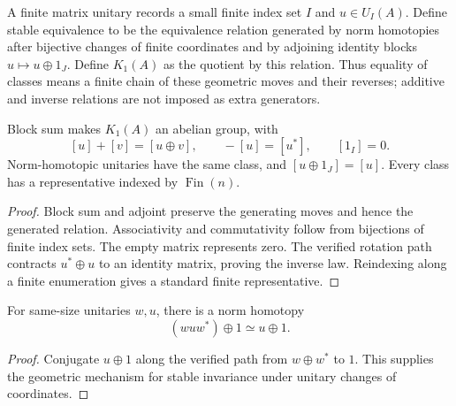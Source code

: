 \begin{definition}\label{def:operator-k1}
\leanok
A finite matrix unitary records a small finite index set $I$ and
$u\in U_I(A)$. Define stable equivalence to be the equivalence relation
generated by norm homotopies after bijective changes of finite coordinates
and by adjoining identity blocks $u\mapsto u\oplus1_J$.
Define $K_1(A)$ as the quotient by this relation. Thus equality of classes
means a finite chain of these geometric moves and their reverses;
additive and inverse relations are not imposed as extra generators.
\end{definition}

\begin{proposition}\label{prop:operator-k1-group}
Block sum makes $K_1(A)$ an abelian group, with
\[
 [u]+[v]=[u\oplus v],\qquad -[u]=[u^*],\qquad [1_I]=0.
\]
Norm-homotopic unitaries have the same class, and $[u\oplus1_J]=[u]$.
Every class has a representative indexed by $\operatorname{Fin}(n)$.
\end{proposition}
\begin{proof}
\leanok
Block sum and adjoint preserve the generating moves and hence the generated
relation. Associativity and commutativity follow from bijections of finite
index sets. The empty matrix represents zero. The verified rotation path
contracts $u^*\oplus u$ to an identity matrix, proving the inverse law.
Reindexing along a finite enumeration gives a standard finite representative.
\end{proof}

\begin{proposition}\label{prop:unitary-stable-conjugation}
For same-size unitaries $w,u$, there is a norm homotopy
\[
 (wuw^*)\oplus1\simeq u\oplus1.
\]
\end{proposition}
\begin{proof}
\leanok
Conjugate $u\oplus1$ along the verified path from $w\oplus w^*$ to $1$.
This supplies the geometric mechanism for stable invariance under unitary
changes of coordinates.
\end{proof}

